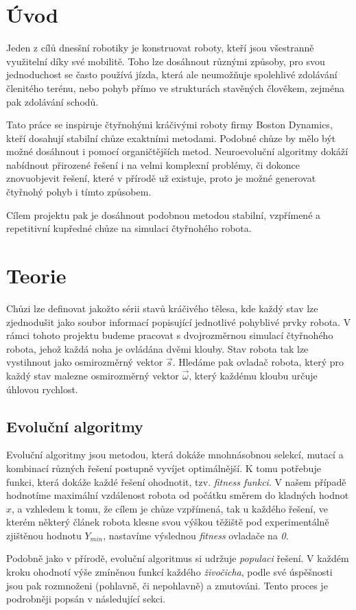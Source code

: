 \documentclass[a4]{article}
\begin{document}
\section{Úvod} 
Jeden z cílů dnesšní robotiky je konstruovat roboty, kteří jsou všestranně využitelní díky své mobilitě. Toho lze dosáhnout různými způsoby, pro svou jednoduchost se často používá jízda, která ale neumožňuje spolehlivé zdolávání členitého terénu, nebo pohyb přímo ve strukturách stavěných člověkem, zejména pak zdolávání schodů.\par
Tato práce se inspiruje čtyřnohými kráčivými roboty firmy Boston Dynamics\cite{bostondynamics}, kteří dosahují stabilní chůze exaktními metodami.\cite{bdpaper} Podobné chůze by mělo být možné dosáhnout i pomocí organičtějších metod. Neuroevoluční algoritmy dokáží nabídnout přirozené řešení i na velmi komplexní problémy, či dokonce znovuobjevit řešení, které v přírodě už existuje, proto je možné generovat čtyřnohý pohyb i tímto způsobem.\cite{clunegait}\par
Cílem projektu pak je dosáhnout podobnou metodou stabilní, vzpřímené a repetitivní kupředné chůze na simulaci čtyřnohého robota.
 
\section{Teorie}
Chůzi lze definovat jakožto sérii stavů kráčivého tělesa, kde každý stav lze zjednodušit jako soubor informací popisující jednotlivé pohyblivé prvky robota. V rámci tohoto projektu budeme pracovat s dvojrozměrnou simulací čtyřnohého robota, jehož každá noha je ovládána dvěmi klouby. Stav robota tak lze vystihnout jako osmirozměrný vektor $\vec{s}$. Hledáme pak ovladač robota, který pro každý stav malezne osmirozměrný vektor $\vec{\omega}$, který každému kloubu určuje úhlovou rychlost.
\subsection{Evoluční algoritmy}
Evoluční algoritmy jsou metodou, která dokáže mnohnásobnou selekcí, mutací a kombinací různých řešení postupně vyvíjet optimálnější. K tomu potřebuje funkci, která dokáže každé řešení ohodnotit, tzv. \emph{fitness funkci}. V našem případě hodnotíme maximální vzdálenost robota od počátku směrem do kladných hodnot $x$, a vzhledem k tomu, že cílem je chůze vzpřímená, tak u každého řešení, ve kterém některý článek robota klesne svou výškou těžiště pod experimentálně zjištěnou hodnotu $Y_{min}$, nastavíme výslednou \emph{fitness} ovladače na \emph{0}.\par
Podobně jako v přírodě, evoluční algoritmus si udržuje \emph{populaci} řešení. V každém kroku ohodnotí výše zmíněnou funkcí každého \emph{živočicha}, podle své úspěšnosti jsou pak rozmnoženi (pohlavně, či nepohlavně) a zmutováni. Tento proces je podrobněji popsán v následující sekci.
\end{document}
